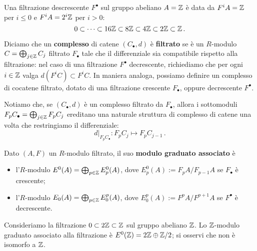 \begin{ex}
	Una filtrazione descrescente $F^{\bullet}$ sul gruppo abeliano $A = {\mathbb Z}$ è data da
	$F^{i}A = {\mathbb Z}$ per $i \le 0$ e $F^{i}A = 2^{i}{\mathbb Z}$ per $i > 0$:
	\begin{equation*}
		0 \subset \dots \subset 16{\mathbb Z} \subset 8{\mathbb Z} \subset 4{\mathbb Z} \subset 2{\mathbb Z} \subset {\mathbb Z}\,.
	\end{equation*}
\end{ex}


\begin{df}
	Diciamo che un \textbf{complesso} di catene $(C_{\bullet}, d)$ è \textbf{filtrato}
	se è un $R$-modulo $C = \bigoplus_{j \in {\mathbb Z}} C_{j}$ filtrato $F_{\bullet}$ tale
	che il differenziale sia compatibile rispetto alla filtrazione: 
	nel caso di una filtrazione $F^{\bullet}$ decrescente,
	richiediamo che per ogni $i \in {\mathbb Z}$ valga
	 $d\left(F^{i}C\right) \subset F^{i}C$.
	 In maniera analoga, possiamo definire un complesso di cocatene filtrato,
	 dotato di una filtrazione crescente $F_{\bullet}$, 
	 oppure decrescente $F^{\bullet}$.
\end{df}

	Notiamo che, se $(C_{\bullet},d)$ è un complesso filtrato da $F_{\bullet}$,
	allora i sottomoduli $F_{p}C_{\bullet}=\bigoplus_{j \in {\mathbb Z}}F_{p}C_{j}$
	ereditano una naturale struttura di complesso di catene
	una volta che restringiamo il differenziale:
	\begin{equation*}
		d\vert_{F_{p}C_{\bullet}} : F_{p}C_{j} \longmapsto F_{p}C_{j-1}\,.
	\end{equation*}

\begin{df}
	Dato $(A,F)$ un $R$-modulo filtrato, il suo \textbf{modulo graduato associato} è
	\begin{itemize}
		\item l'$R$-modulo $E^{0}(A) = \bigoplus_{p \in {\mathbb Z}} E^{0}_{p}(A)$, 
		dove $E^{0}_{p}(A) := F_{p}A/F_{p-1}A$ se $F_{\bullet}$ è crescente;
		
		\item l'$R$-modulo $E_{0}(A) = \bigoplus_{p \in {\mathbb Z}} E_{0}^{p}(A)$, 
		dove $E^{p}_{0}(A) := F^{p}A/F^{p+1}A$ se $F^{\bullet}$ è decrescente.
	\end{itemize}
\end{df}

\begin{ex}
	Consideriamo la filtrazione $0 \subset 2{\mathbb Z} \subset {\mathbb Z}$ sul gruppo abeliano ${\mathbb Z}$.
	Lo ${\mathbb Z}$-modulo graduato associato alla filtrazione è $E^{0}({\mathbb Z})=2{\mathbb Z} \oplus {\mathbb Z}/2$;
	si osservi che non è isomorfo a ${\mathbb Z}$.
\end{ex}

